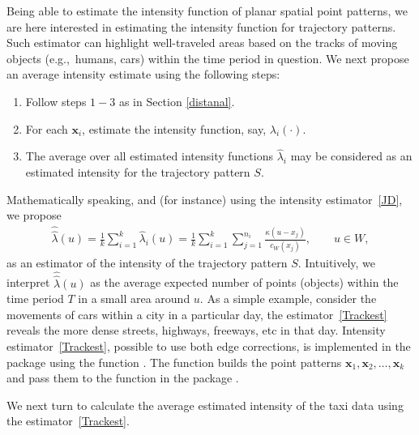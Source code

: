 \documentclass[article]{jss}
\begin{document}
  Being able to estimate the intensity function of planar spatial point patterns, we are here interested in estimating the intensity function for trajectory patterns. Such estimator can highlight well-traveled areas based on the tracks of moving objects (e.g.,\ humans, cars) within the time period in question. We next propose an average intensity estimate using the following steps:
  \begin{leftbar}
  \begin{enumerate}
  \item Follow steps $1-3$ as in Section \ref{distanal}.
  \item For each $\mathbf{x}_i$, estimate the intensity function, say, $\lambda_i(\cdot)$.
  \item The average over all estimated intensity functions $\widehat{\lambda}_i$ may be considered as an estimated intensity for the trajectory pattern $S$.
  \end{enumerate}
  \end{leftbar}
  Mathematically speaking, and (for instance) using the intensity estimator~\ref{JD}, we propose
  \begin{eqnarray}\label{Trackest}
  \widehat{\widehat{\lambda}}(u)=\frac{1}{k} \sum\limits_{i=1}^{k} \widehat{\lambda}_i(u) =\frac{1}{k}\sum\limits_{i=1}^{k} \sum\limits_{j=1}^{n_i} \frac{\kappa(u-x_j)}{c_W(x_j)}, \qquad u \in W,
  \end{eqnarray}
  as an estimator of the intensity of the trajectory pattern $S$. Intuitively, we interpret $\widehat{\widehat{\lambda}}(u)$ as the average expected number of points (objects) within the time period $T$ in a small area around $u$. As a simple example, consider the movements of cars within a city in a particular day, the estimator~\ref{Trackest} reveals the more dense streets, highways, freeways, etc in that day. Intensity estimator~\ref{Trackest}, possible to use both edge corrections, is implemented in the  package using the function . The function  builds the point patterns $\mathbf{x}_1,\mathbf{x}_2, \ldots, \mathbf{x}_k$ and pass them to the function  in the package .

We next turn to calculate the average estimated intensity of the taxi data using the estimator~\ref{Trackest}.
\end{document}
